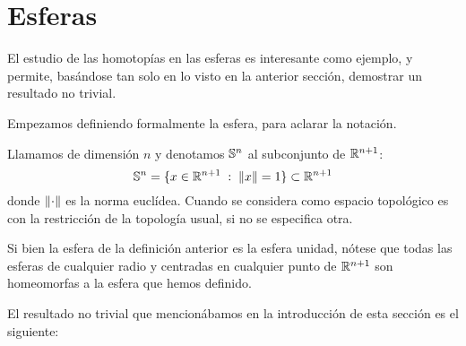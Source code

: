 \section{Esferas}

El estudio de las homotopías en las esferas es interesante como ejemplo, y permite, basándose tan solo en lo visto en la anterior sección, demostrar un resultado no trivial.

Empezamos definiendo formalmente la esfera, para aclarar la notación.

\begin{defi}[Esfera]
	Llamamos  de dimensión $n$ y denotamos $\mathbb{S}^n$ al subconjunto de $\mathbb{R}^{n+1}$:
	\[\mathbb{S}^n = \{x\in\mathbb{R}^{n+1}\;:\; \lVert x\rVert=1\}\subset\mathbb{R}^{n+1}\]
	donde $\lVert\cdot\rVert$ es la norma euclídea. Cuando se considera como espacio topológico es con la restricción de la topología usual, si no se especifica otra.
\end{defi}

\begin{obs}
	Si bien la esfera de la definición anterior es la esfera unidad, nótese que todas las esferas de cualquier radio y centradas en cualquier punto de $\mathbb{R}^{n+1}$ son homeomorfas a la esfera que hemos definido.
\end{obs}

El resultado no trivial que mencionábamos en la introducción de esta sección es el siguiente:

